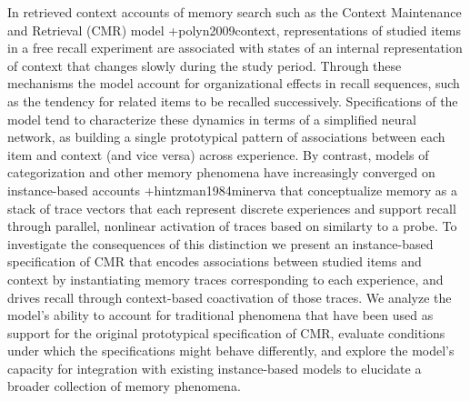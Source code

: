In retrieved context accounts of memory search such as the Context Maintenance and Retrieval (CMR) model +{}{}{polyn2009context}, representations of studied items in a free recall experiment are associated with states of an internal representation of context that changes slowly during the study period. Through these mechanisms the model account for organizational effects in recall sequences, such as the tendency for related items to be recalled successively. Specifications of the model tend to characterize these dynamics in terms of a simplified neural network, as building a single prototypical pattern of associations between each item and context (and vice versa) across experience. By contrast, models of categorization and other memory phenomena have increasingly converged on instance-based accounts +{}{}{hintzman1984minerva} that conceptualize memory as a stack of trace vectors that each represent discrete experiences and support recall through parallel, nonlinear activation of traces based on similarty to a probe. To investigate the consequences of this distinction we present an instance-based specification of CMR that encodes associations between studied items and context by instantiating memory traces corresponding to each experience, and drives recall through context-based coactivation of those traces. We analyze the model's ability to account for traditional phenomena that have been used as support for the original prototypical specification of CMR, evaluate conditions under which the specifications might behave differently, and explore the model's capacity for integration with existing instance-based models to elucidate a broader collection of memory phenomena.\relax